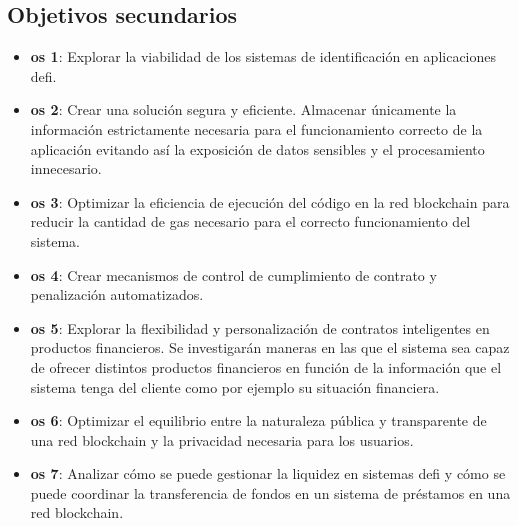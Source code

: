 \subsection{Objetivos secundarios}
\begin{itemize}
    \item {}\label{os:1}\textbf{\gls{os} 1}: Explorar la viabilidad de los sistemas de identificación 
    en aplicaciones \gls{defi}.

    \item {}\label{os:2}\textbf{\gls{os} 2}: Crear una solución segura y eficiente.  
    Almacenar únicamente la información estrictamente necesaria para el funcionamiento 
    correcto de la aplicación evitando así la exposición de datos sensibles y el procesamiento 
    innecesario.

    \item {}\label{os:3}\textbf{\gls{os} 3}: Optimizar la eficiencia de ejecución del código en
    la red blockchain para reducir la cantidad de \gls{gas} 
    necesario para el correcto funcionamiento del sistema.

    \item {}\label{os:4}\textbf{\gls{os} 4}: Crear mecanismos de control de  cumplimiento de contrato 
    y penalización automatizados.
    
    \item {}\label{os:5}\textbf{\gls{os} 5}: Explorar la flexibilidad y personalización de 
    contratos inteligentes en productos financieros. 
    Se investigarán maneras en las que el sistema sea capaz de ofrecer 
    distintos productos financieros en función de la información que el sistema tenga 
    del cliente como por ejemplo su situación financiera. 
    
    \item {}\label{os:6}\textbf{\gls{os} 6}: Optimizar el equilibrio entre la naturaleza pública y transparente
    de una red \gls{blockchain} y la privacidad necesaria para los usuarios. 
    
    \item {}\label{os:7}\textbf{\gls{os} 7}: Analizar cómo se puede gestionar la liquidez en sistemas 
    \gls{defi} y cómo se  puede coordinar la transferencia de fondos en un sistema 
    de préstamos en una red \gls{blockchain}.
\end{itemize}

